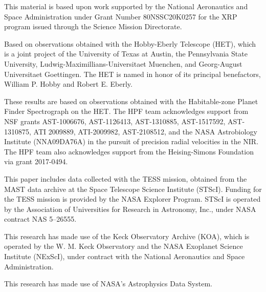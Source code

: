 \documentclass[twocolumn]{aastex631}
\begin{document}
\begin{acknowledgements}

    This material is based upon work supported by the National Aeronautics and Space Administration under Grant Number 80NSSC20K0257 for the XRP program issued through the Science Mission Directorate.

    Based on observations obtained with the Hobby-Eberly Telescope (HET), which is a joint project of the University of Texas at Austin, the Pennsylvania State University, Ludwig-Maximillians-Universitaet Muenchen, and Georg-August Universitaet Goettingen. The HET is named in honor of its principal benefactors, William P. Hobby and Robert E. Eberly.

    These results are based on observations obtained with the Habitable-zone Planet Finder Spectrograph on the HET. The HPF team acknowledges support from NSF grants AST-1006676, AST-1126413, AST-1310885, AST-1517592, AST-1310875, ATI 2009889, ATI-2009982, AST-2108512, and the NASA Astrobiology Institute (NNA09DA76A) in the pursuit of precision radial velocities in the NIR. The HPF team also acknowledges support from the Heising-Simons Foundation via grant 2017-0494.

    This paper includes data collected with the TESS mission, obtained from the MAST data archive at the Space Telescope Science Institute (STScI). Funding for the TESS mission is provided by the NASA Explorer Program. STScI is operated by the Association of Universities for Research in Astronomy, Inc., under NASA contract NAS 5–26555.

    This research has made use of the Keck Observatory Archive (KOA), which is operated by the W. M. Keck Observatory and the NASA Exoplanet Science Institute (NExScI), under contract with the National Aeronautics and Space Administration.

    This research has made use of NASA's Astrophysics Data System.
\end{acknowledgements}




\clearpage



\end{document}
